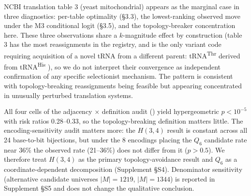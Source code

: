 \documentclass[preprint,11pt,authoryear,a4paper]{elsarticle}
\begin{document}
NCBI translation table 3 (yeast mitochondrial) appears as the marginal
case in three diagnostics: per-table optimality (§3.3), the
lowest-ranking observed move under the M3 conditional logit (§3.5), and
the topology-breaker concentration here. These three observations share
a \(k\)-magnitude effect by construction (table 3 has the most
reassignments in the registry, and is the only variant code requiring
acquisition of a novel tRNA from a different parent:
tRNA\textsuperscript{Thr} derived from tRNA\textsuperscript{His}
\citep{su2011}), so we do not interpret their convergence as independent
confirmation of any specific selectionist mechanism. The pattern is
consistent with topology-breaking reassignments being feasible but
appearing concentrated in unusually perturbed translation systems.

All four cells of the adjacency \(\times\) definition audit
() yield hypergeometric \(p < 10^{- 5}\) with risk
ratios 0.28--0.33, so the topology-breaking definition matters little.
The encoding-sensitivity audit matters more: the \(H(3,4)\) result is
constant across all 24 base-to-bit bijections, but under the 8 encodings
placing the \(Q_{6}\) candidate rate near 36\% the observed rate
(21--36\%) does not differ from it (\(p > 0.5\)). We therefore treat
\(H(3,4)\) as the primary topology-avoidance result and \(Q_{6}\) as a
coordinate-dependent decomposition (Supplement §S4). Denominator
sensitivity (alternative candidate universes \(|M| = 1219\),
\(|M| = 1344\)) is reported in Supplement §S5 and does not change the
qualitative conclusion.
\end{document}
